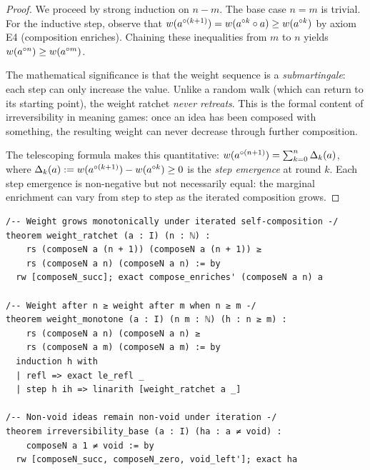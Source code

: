 \begin{proof}
We proceed by strong induction on $n - m$. The base case $n = m$ is
trivial. For the inductive step, observe that
$w(a^{\circ (k+1)}) = w(a^{\circ k} \circ a) \geq w(a^{\circ k})$
by axiom E4 (composition enriches). Chaining these inequalities from
$m$ to $n$ yields $w(a^{\circ n}) \geq w(a^{\circ m})$.

The mathematical significance is that the weight sequence is a
\emph{submartingale}: each step can only increase the value. Unlike
a random walk (which can return to its starting point), the weight
ratchet \emph{never retreats}. This is the formal content of
irreversibility in meaning games: once an idea has been composed
with something, the resulting weight can never decrease through
further composition.

The telescoping formula makes this quantitative:
$w(a^{\circ (n+1)}) = \sum_{k=0}^{n} \Delta_k(a)$, where
$\Delta_k(a) := w(a^{\circ (k+1)}) - w(a^{\circ k}) \geq 0$
is the \emph{step emergence} at round $k$. Each step emergence is
non-negative but not necessarily equal: the marginal enrichment can
vary from step to step as the iterated composition grows.
\end{proof}

\begin{lstlisting}[caption={Lean 4: Weight ratchet and irreversibility}]
/-- Weight grows monotonically under iterated self-composition -/
theorem weight_ratchet (a : I) (n : ℕ) :
    rs (composeN a (n + 1)) (composeN a (n + 1)) ≥
    rs (composeN a n) (composeN a n) := by
  rw [composeN_succ]; exact compose_enriches' (composeN a n) a

/-- Weight after n ≥ weight after m when n ≥ m -/
theorem weight_monotone (a : I) (n m : ℕ) (h : n ≥ m) :
    rs (composeN a n) (composeN a n) ≥
    rs (composeN a m) (composeN a m) := by
  induction h with
  | refl => exact le_refl _
  | step h ih => linarith [weight_ratchet a _]

/-- Non-void ideas remain non-void under iteration -/
theorem irreversibility_base (a : I) (ha : a ≠ void) :
    composeN a 1 ≠ void := by
  rw [composeN_succ, composeN_zero, void_left']; exact ha
\end{lstlisting}

